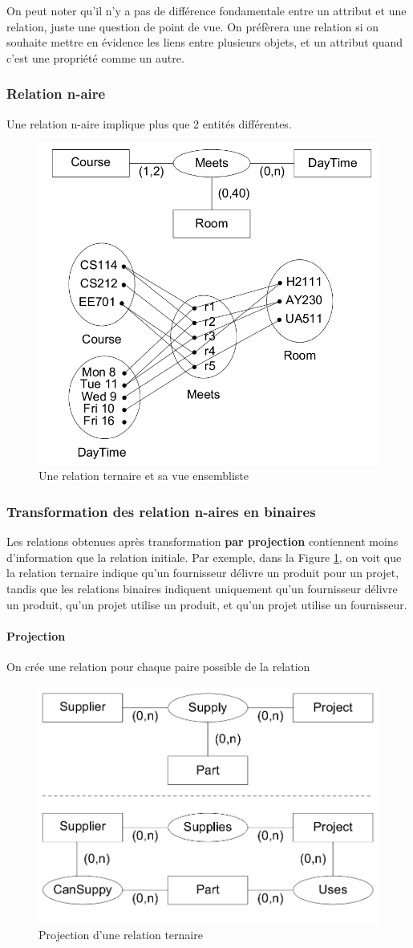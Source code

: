 \documentclass[a4paper]{article}
\begin{document}
On peut noter qu'il n'y a pas de différence fondamentale entre un attribut et une relation,
juste une question de point de vue. On préfèrera une relation si on souhaite mettre en évidence
les liens entre plusieurs objets, et un attribut quand c'est une propriété comme un autre.

\subsubsection{Relation n-aire}
Une relation n-aire implique plus que 2 entités différentes.

\begin{figure}[H]
    \center
    \includegraphics[width=.4\textwidth]{fig/relation-naire.png}
    \caption{Une relation ternaire et sa vue ensembliste}
\end{figure}

\subsubsection{Transformation des relation n-aires en binaires}
Les relations obtenues après transformation \textbf{par projection} contiennent moins d'information
que la relation initiale. Par exemple, dans la Figure \ref{fig:relation-naire-projection},
on voit que la relation ternaire indique qu'un fournisseur délivre un produit pour un projet,
tandis que les relations binaires indiquent uniquement qu'un fournisseur délivre un produit,
qu'un projet utilise un produit, et qu'un projet utilise un fournisseur.

\paragraph{Projection}
On crée une relation pour chaque paire possible de la relation
\begin{figure}[H]
    \center
    \includegraphics[width=.4\textwidth]{fig/relation-naire-projection.png}
    \caption{\label{fig:relation-naire-projection}Projection d'une relation ternaire}
\end{figure}
\end{document}

